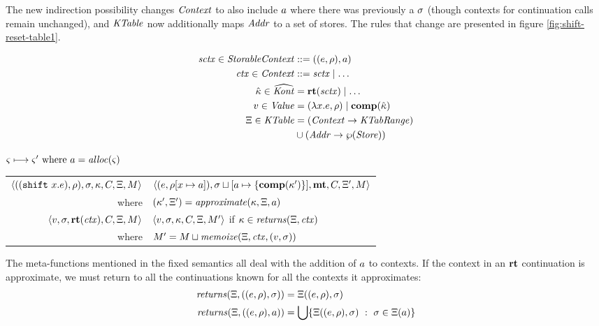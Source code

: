 The new indirection possibility changes $\mathit{Context}$ to also include $a$ where there was previously a $\sigma$ (though contexts for continuation calls remain unchanged), and $\mathit{KTable}$ now additionally maps $\mathit{Addr}$ to a set of stores.
%
The rules that change are presented in figure \ref{fig:shift-reset-table1}.

\begin{align*}
  \mathit{sctx} \in \mathit{StorableContext} &::= ((e,\rho),a) \\
  \mathit{ctx} \in \mathit{Context} &::= \mathit{sctx} \mid \ldots \\
  \hat{\kappa} \in \widehat{\mathit{Kont}} &= \mathbf{rt}(\mathit{sctx}) \mid \ldots \\
  v \in \mathit{Value} &= (\lambda{} x. e, \rho) \mid \mathbf{comp}(\hat{\kappa}) \\
  \Xi \in \mathit{KTable} &= (\mathit{Context} \to \mathit{KTabRange}) \\
                   &\cup (\mathit{Addr} \to \wp(\mathit{Store}))
\end{align*}

\begin{figure*}
  \centering
  $\varsigma \longmapsto \varsigma' \text{ where } a = \mathit{alloc}(\varsigma)$ \\
  \begin{tabular}{r|l}
    \hline
    $\langle ((\texttt{shift}\ x. e), \rho), \sigma, \kappa, C, \Xi, M \rangle$
    &
    $\langle (e, \rho[x \mapsto a]), \sigma\sqcup[a \mapsto \{ \mathbf{comp}(\kappa') \}],\mathbf{mt},C,\Xi',M \rangle$
    \\
    where & $(\kappa',\Xi') = \mathit{approximate}(\kappa, \Xi, a)$
\\
   $\langle v, \sigma, \mathbf{rt}(\mathit{ctx}), C, \Xi, M \rangle$
   &
   $\langle v, \sigma, \kappa, C, \Xi, M' \rangle$
   if $\kappa \in \mathit{returns}(\Xi, \mathit{ctx})$
   \\
   where & $M' = M \sqcup \mathit{memoize}(\Xi, \mathit{ctx}, (v, \sigma))$
  \end{tabular}
  \caption{Fixed table-based semantics for shift/reset}
  \label{fig:shift-reset-table1}
\end{figure*}

The meta-functions mentioned in the fixed semantics all deal with the addition of $a$ to contexts.
%
If the context in an $\mathbf{rt}$ continuation is approximate, we must return to all the continuations known for all the contexts it approximates:
\begin{align*}
  \mathit{returns}(\Xi, ((e,\rho), \sigma)) &= \Xi((e,\rho), \sigma) \\
  \mathit{returns}(\Xi, ((e,\rho), a)) &=
    \bigcup\{ \Xi((e,\rho),\sigma)\ :\ \sigma \in \Xi(a)\}
\end{align*}

